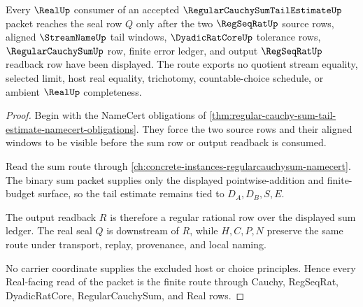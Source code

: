 \begin{theorem}
\label{thm:regular-cauchy-sum-tail-estimate-real-seal-route}
Every $\RealUp$ consumer of an accepted $\RegularCauchySumTailEstimateUp$ packet reaches the seal row $Q$ only after the two $\RegSeqRatUp$ source rows, aligned $\StreamNameUp$ tail windows, $\DyadicRatCoreUp$ tolerance rows, $\RegularCauchySumUp$ row, finite error ledger, and output $\RegSeqRatUp$ readback row have been displayed. The route exports no quotient stream equality, selected limit, host real equality, trichotomy, countable-choice schedule, or ambient $\RealUp$ completeness.
\end{theorem}
\begin{proof}
Begin with the NameCert obligations of \autoref{thm:regular-cauchy-sum-tail-estimate-namecert-obligations}. They force the two source rows and their aligned windows to be visible before the sum row or output readback is consumed.

Read the sum route through \autoref{ch:concrete-instances-regularcauchysum-namecert}. The binary sum packet supplies only the displayed pointwise-addition and finite-budget surface, so the tail estimate remains tied to $D_A,D_B,S,E$.

The output readback $R$ is therefore a regular rational row over the displayed sum ledger. The real seal $Q$ is downstream of $R$, while $H,C,P,N$ preserve the same route under transport, replay, provenance, and local naming.

No carrier coordinate supplies the excluded host or choice principles. Hence every Real-facing read of the packet is the finite route through Cauchy, RegSeqRat, DyadicRatCore, RegularCauchySum, and Real rows.
\end{proof}


\begin{closurestatus}{\RegularCauchySumTailEstimateUp}
  \theoryclosure{\seedClosure}
  \formalstatus{\unformalizedV}
\end{closurestatus}
